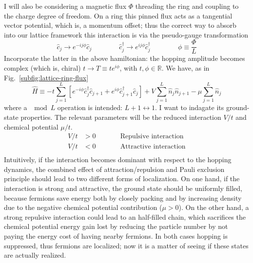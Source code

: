 I will also be considering a magnetic flux $\Phi$ threading the ring and coupling to the charge degree of freedom. On a ring this pinned flux acts as a tangential vector potential, which is, a momentum offset; thus the correct way to absorb into our lattice framework this interaction is via the pseudo-gauge transformation
\begin{equation}\label{eq:pseudo-gauge-transformation}
	\hat c_j \to e^{-ij \phi} \hat c_j
	\qquad\qquad
	\hat c_j^\dagger \to e^{ij \phi} \hat c_j^\dagger
	\qquad\qquad
	\phi \equiv \frac{\Phi}{L}
\end{equation}
Incorporate the latter in the above hamiltonian: the hopping amplitude becomes complex (which is, chiral) $t \to T \equiv t e^{i\phi}$, with $t, \phi \in \mathbb{R}$. We have, as in Fig.~\ref{subfig:lattice-ring-flux}
\begin{equation}\label{eq:spinless-hamiltonian-tbc}
	\hat H \equiv -t \sum_{j=1}^L \left[ 
		e^{-i\phi} \hat c_j^\dagger \hat c_{j+1} + e^{i\phi} \hat c_{j+1}^\dagger \hat c_j 
	\right] + V \sum_{j=1}^L \hat n_j \hat n_{j+1} - \mu \sum_{j=1}^L \hat n_j
\end{equation}
where a $\mod L$ operation is intended: $L+1 \leftrightarrow 1$. I want to indagate its ground-state properties. The relevant parameters will be the reduced interaction $V/t$ and chemical potential $\mu/t$.
\[
	\begin{aligned}
		V/t &> 0 \qquad
		&&\text{Repulsive interaction} \\
		V/t &< 0 \qquad
		&&\text{Attractive interaction} \\
	\end{aligned}
\]
Intuitively, if the interaction becomes dominant with respect to the hopping dynamics, the combined effect of attraction/repulsion and Pauli exclusion principle should lead to two different forms of localization. On one hand, if the interaction is strong and attractive, the ground state should be uniformly filled, because fermions save energy both by closely packing and by increasing density due to the negative chemical potential contribution ($\mu > 0$). On the other hand, a strong repulsive interaction could lead to an half-filled chain, which sacrifices the chemical potential energy gain lost by reducing the particle number by not paying the energy cost of having nearby fermions. In both cases hopping is suppressed, thus fermions are localized; now it is a matter of seeing if these states are actually realized.

